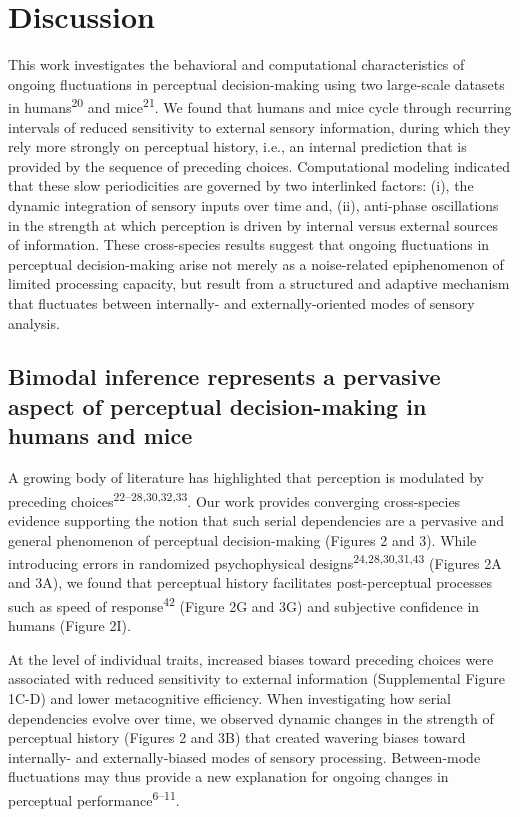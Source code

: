 \documentclass[
]{article}
\begin{document}
\hypertarget{discussion}{%
\section{Discussion}\label{discussion}}

This work investigates the behavioral and computational characteristics
of ongoing fluctuations in perceptual decision-making using two
large-scale datasets in humans\textsuperscript{20} and
mice\textsuperscript{21}. We found that humans and mice cycle through
recurring intervals of reduced sensitivity to external sensory
information, during which they rely more strongly on perceptual history,
i.e., an internal prediction that is provided by the sequence of
preceding choices. Computational modeling indicated that these slow
periodicities are governed by two interlinked factors: (i), the dynamic
integration of sensory inputs over time and, (ii), anti-phase
oscillations in the strength at which perception is driven by internal
versus external sources of information. These cross-species results
suggest that ongoing fluctuations in perceptual decision-making arise
not merely as a noise-related epiphenomenon of limited processing
capacity, but result from a structured and adaptive mechanism that
fluctuates between internally- and externally-oriented modes of sensory
analysis.

\hypertarget{bimodal-inference-represents-a-pervasive-aspect-of-perceptual-decision-making-in-humans-and-mice}{%
\subsection{Bimodal inference represents a pervasive aspect of
perceptual decision-making in humans and
mice}\label{bimodal-inference-represents-a-pervasive-aspect-of-perceptual-decision-making-in-humans-and-mice}}

A growing body of literature has highlighted that perception is
modulated by preceding choices\textsuperscript{22--28,30,32,33}. Our
work provides converging cross-species evidence supporting the notion
that such serial dependencies are a pervasive and general phenomenon of
perceptual decision-making (Figures 2 and 3). While introducing errors
in randomized psychophysical designs\textsuperscript{24,28,30,31,43}
(Figures 2A and 3A), we found that perceptual history facilitates
post-perceptual processes such as speed of response\textsuperscript{42}
(Figure 2G and 3G) and subjective confidence in humans (Figure 2I).

At the level of individual traits, increased biases toward preceding
choices were associated with reduced sensitivity to external information
(Supplemental Figure 1C-D) and lower metacognitive efficiency. When
investigating how serial dependencies evolve over time, we observed
dynamic changes in the strength of perceptual history (Figures 2 and 3B)
that created wavering biases toward internally- and externally-biased
modes of sensory processing. Between-mode fluctuations may thus provide
a new explanation for ongoing changes in perceptual
performance\textsuperscript{6--11}.
\end{document}
